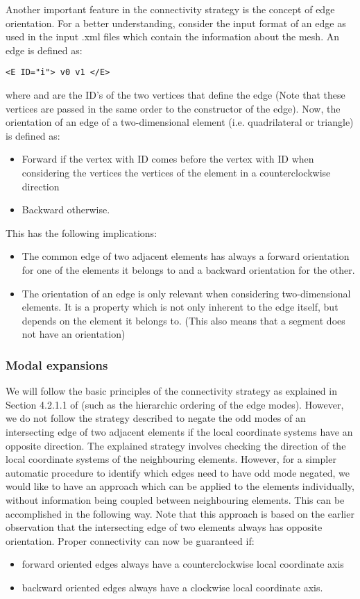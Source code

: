 Another important feature in the connectivity strategy is the concept of edge
orientation. For a better understanding, consider the input format of an edge as
used in the input .xml files which contain the information about the mesh. An
edge is defined as:
\begin{lstlisting}[style=XMLStyle]
 <E ID="i"> v0 v1 </E>
\end{lstlisting}
where  and  are the ID's of the two vertices that define
the edge (Note that these vertices are passed in the same order to the constructor
of the edge). Now, the orientation of an edge of a two-dimensional element (i.e.
quadrilateral or triangle) is defined as:
\begin{itemize}
\item Forward if the vertex with ID  comes before the vertex with ID
 when considering the vertices the vertices of the element in a
counterclockwise direction 
\item Backward otherwise.
\end{itemize}

This has the following implications:
\begin{itemize}
\item The common edge of two adjacent elements has always a forward orientation
for one of the elements it belongs to and a backward orientation for the other.
\item The orientation of an edge is only relevant when considering
two-dimensional elements. It is a property which is not only inherent to the edge itself, but
 depends on the element it belongs to. (This also means that a segment does not
 have an orientation)
\end{itemize}

\subsubsection{Modal expansions}

We will follow the basic principles of the connectivity strategy as explained in
Section 4.2.1.1 of \cite{KaSh05} (such as the hierarchic ordering of the edge
modes). However, we do not follow the strategy described to negate the odd modes
of an intersecting edge of two adjacent elements if the local coordinate systems
have an opposite direction. The explained strategy involves checking the
direction of the local coordinate systems of the neighbouring elements. However,
for a simpler automatic procedure to identify which edges need to have odd mode
negated, we would like to have an approach which can be applied to the elements
individually, without information being coupled between neighbouring elements.
This can be accomplished in the following way. Note that this approach is based
on the earlier observation that the intersecting edge of two elements always has
opposite orientation. Proper connectivity can now be guaranteed if:
\begin{itemize}
\item forward oriented edges always have a counterclockwise local coordinate
axis 
\item backward oriented edges always have a clockwise local coordinate axis.
\end{itemize}

